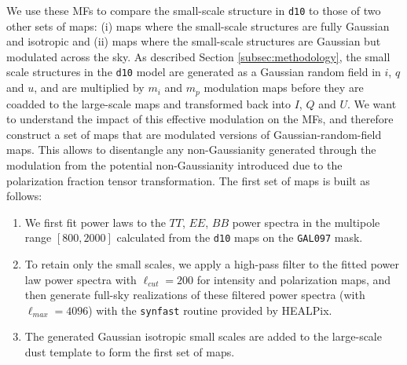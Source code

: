 \documentclass[twocolumn]{aastex631}
\begin{document}
We use these MFs to compare the small-scale structure in \texttt{d10} to those of two other sets of maps: (i) maps where the small-scale structures are fully Gaussian and isotropic and (ii) maps where the small-scale structures are Gaussian but modulated across the sky. As described Section \ref{subsec:methodology}, the small scale structures in the \texttt{d10} model are generated as a Gaussian random field in $i$, $q$ and $u$, and are multiplied by $m_i$ and $m_p$ modulation maps before they are coadded to the large-scale maps and transformed back into $I$, $Q$ and $U$. %
We want to understand the impact of this effective modulation on the MFs, and therefore construct a set of maps that are modulated versions of Gaussian-random-field maps. 
This allows to disentangle any non-Gaussianity generated through the modulation from the potential non-Gaussianity introduced due to the polarization fraction tensor transformation.   
The first set of maps is built as follows:
\begin{enumerate}

\item We first fit power laws to the $TT$, $EE$, $BB$ power spectra in the multipole range $[800, 2000]$ calculated from the \texttt{d10} maps on the \texttt{GAL097} mask. 

\item To retain only the small scales, we apply a high-pass filter to the fitted power law power spectra with $\ell_{cut} = 200$ for intensity and polarization maps, and then generate full-sky realizations of these filtered power spectra (with $\ell_{max}=4096$) with the \texttt{synfast} routine provided by HEALPix. 

\item The generated Gaussian isotropic small scales are added to the large-scale dust template to form the first set of maps.

\end{enumerate}
\end{document}
